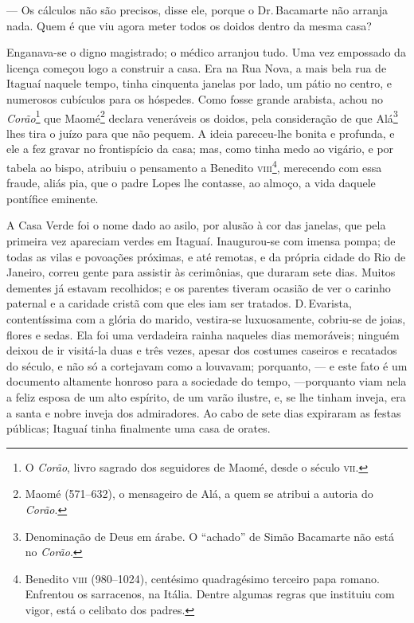 --- Os cálculos não são precisos, disse ele, porque o Dr.\,Bacamarte não
arranja nada. Quem é que viu agora meter todos os doidos dentro da mesma
casa?

Enganava-se o digno magistrado; o médico arranjou tudo. Uma vez
empossado da licença começou logo a construir a casa. Era na Rua Nova, a
mais bela rua de Itaguaí naquele tempo, tinha cinquenta janelas por
lado, um pátio no centro, e numerosos cubículos para os hóspedes. Como
fosse grande arabista, achou no \emph{Corão}\footnote{O \emph{Corão},
  livro sagrado dos seguidores de Maomé, desde o século \textsc{vii}.} que
Maomé\footnote{Maomé (571--632), o mensageiro de Alá, a quem se atribui a
  autoria do \emph{Corão}.} declara veneráveis os doidos, pela
consideração de que Alá\footnote{Denominação de Deus em árabe. O
  ``achado'' de Simão Bacamarte não está no \emph{Corão}.} lhes tira o
juízo para que não pequem. A ideia pareceu-lhe bonita e profunda, e ele
a fez gravar no frontispício da casa; mas, como tinha medo ao vigário, e
por tabela ao bispo, atribuiu o pensamento a Benedito \textsc{viii}\footnote{Benedito
  \textsc{viii} (980--1024), centésimo quadragésimo terceiro papa romano.
  Enfrentou os sarracenos, na Itália. Dentre algumas regras que
  instituiu com vigor, está o celibato dos padres.}, merecendo com essa
fraude, aliás pia, que o padre Lopes lhe contasse, ao almoço, a vida
daquele pontífice eminente.

A Casa Verde foi o nome dado ao asilo, por alusão à cor das janelas, que
pela primeira vez apareciam verdes em Itaguaí. Inaugurou-se com imensa
pompa; de todas as vilas e povoações próximas, e até remotas, e da
própria cidade do Rio de Janeiro, correu gente para assistir às
cerimônias, que duraram sete dias. Muitos dementes já estavam
recolhidos; e os parentes tiveram ocasião de ver o carinho paternal e a
caridade cristã com que eles iam ser tratados. D.\,Evarista,
contentíssima com a glória do marido, vestira-se luxuosamente, cobriu-se
de joias, flores e sedas. Ela foi uma verdadeira rainha naqueles dias
memoráveis; ninguém deixou de ir visitá-la duas e três vezes, apesar dos
costumes caseiros e recatados do século, e não só a cortejavam como a
louvavam; porquanto, --- e este fato é um documento altamente honroso
para a sociedade do tempo, ---porquanto viam nela a feliz esposa de um
alto espírito, de um varão ilustre, e, se lhe tinham inveja, era a santa
e nobre inveja dos admiradores. Ao cabo de sete dias expiraram as festas
públicas; Itaguaí tinha finalmente uma casa de orates.

